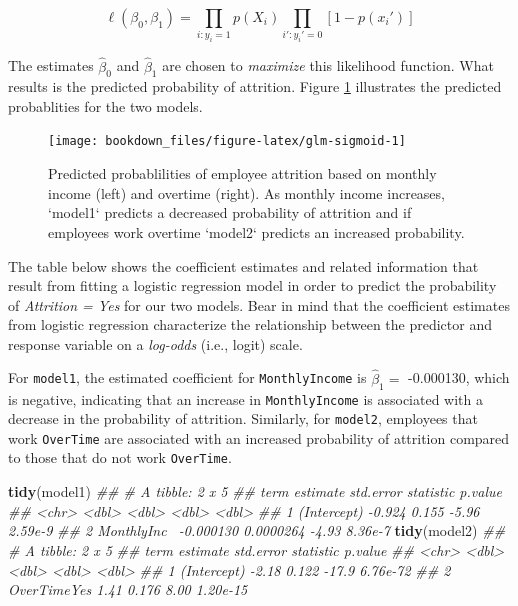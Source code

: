 \documentclass[]{krantz}
\makeatletter
\newenvironment{Shaded}{\begin{snugshade}}{\end{snugshade}}
\newcommand{\CommentTok}[1]{\textcolor[rgb]{0.37,0.37,0.37}{\textit{#1}}}
\newcommand{\KeywordTok}[1]{\textcolor[rgb]{0.27,0.27,0.27}{\textbf{#1}}}
\newcommand{\NormalTok}[1]{#1}
\newenvironment{kframe}{%
\medskip{}
\setlength{\fboxsep}{.8em}
 \def\at@end@of@kframe{}%
 \ifinner\ifhmode%
  \def\at@end@of@kframe{\end{minipage}}%
  \begin{minipage}{\columnwidth}%
 \fi\fi%
 \def\FrameCommand##1{\hskip\@totalleftmargin \hskip-\fboxsep
 \colorbox{shadecolor}{##1}\hskip-\fboxsep
     \hskip-\linewidth \hskip-\@totalleftmargin \hskip\columnwidth}%
 \MakeFramed {\advance\hsize-\width
   \@totalleftmargin\z@ \linewidth\hsize
   \@setminipage}}%
 {\par\unskip\endMakeFramed%
 \at@end@of@kframe}
\renewenvironment{Shaded}{\begin{kframe}}{\end{kframe}}
\makeatother
\begin{document}
\begin{equation}
\label{eq:max-like} 
  \ell\left(\beta_0, \beta_1\right) = \prod_{i:y_i=1}p\left(X_i\right) \prod_{i':y_i'=0}\left[1-p\left(x_i'\right)\right]
\end{equation}

The estimates \(\widehat \beta_0\) and \(\widehat \beta_1\) are chosen to \emph{maximize} this likelihood function. What results is the predicted probability of attrition. Figure \ref{fig:glm-sigmoid} illustrates the predicted probablities for the two models.

\begin{figure}

{\centering \texttt{[image: bookdown\_files/figure-latex/glm-sigmoid-1]} 

}

\caption{Predicted probablilities of employee attrition based on monthly income (left) and overtime (right). As monthly income increases, `model1` predicts a decreased probability of attrition and if employees work overtime `model2` predicts an increased probability.}\label{fig:glm-sigmoid}
\end{figure}

The table below shows the coefficient estimates and related information that result from fitting a logistic regression model in order to predict the probability of \emph{Attrition = Yes} for our two models. Bear in mind that the coefficient estimates from logistic regression characterize the relationship between the predictor and response variable on a \emph{log-odds} (i.e., logit) scale.

For \texttt{model1}, the estimated coefficient for \texttt{MonthlyIncome} is \(\widehat \beta_1 =\) -0.000130, which is negative, indicating that an increase in \texttt{MonthlyIncome} is associated with a decrease in the probability of attrition. Similarly, for \texttt{model2}, employees that work \texttt{OverTime} are associated with an increased probability of attrition compared to those that do not work \texttt{OverTime}.

\begin{Shaded}
\begin{Highlighting}[]
\KeywordTok{tidy}\NormalTok{(model1)}
\CommentTok{## # A tibble: 2 x 5}
\CommentTok{##   term         estimate std.error statistic     p.value}
\CommentTok{##   <chr>           <dbl>     <dbl>     <dbl>       <dbl>}
\CommentTok{## 1 (Intercept) -0.924    0.155         -5.96     2.59e-9}
\CommentTok{## 2 MonthlyInc~ -0.000130 0.0000264     -4.93     8.36e-7}
\KeywordTok{tidy}\NormalTok{(model2)}
\CommentTok{## # A tibble: 2 x 5}
\CommentTok{##   term        estimate std.error statistic  p.value}
\CommentTok{##   <chr>          <dbl>     <dbl>     <dbl>    <dbl>}
\CommentTok{## 1 (Intercept)    -2.18     0.122    -17.9  6.76e-72}
\CommentTok{## 2 OverTimeYes     1.41     0.176      8.00 1.20e-15}
\end{Highlighting}
\end{Shaded}
\end{document}
